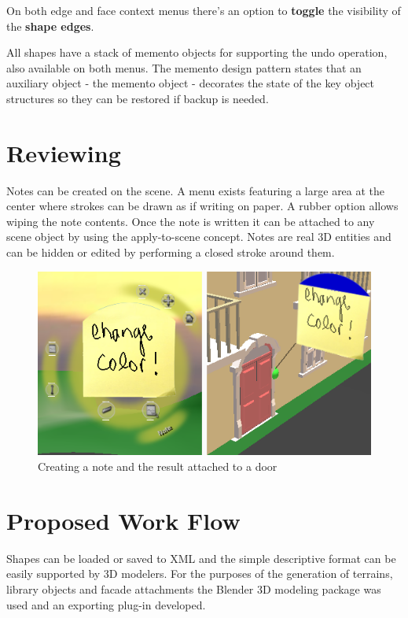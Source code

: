 On both edge and face context menus there's an option to \textbf{toggle} the visibility of the \textbf{shape edges}.

All shapes have a stack of memento objects for supporting the undo operation, also available on both menus.
The memento design pattern states that an auxiliary object - the memento object - decorates the state of the key object structures so they
can be restored if backup is needed.


\section{Reviewing}

Notes can be created on the scene. A menu exists featuring a large area at the center where strokes can be drawn as if writing on paper.
A rubber option allows wiping the note contents. Once the note is written it can be attached to any scene object by using the
apply-to-scene concept. Notes are real 3D entities and can be hidden or edited by performing a closed stroke around them.

\begin{figure}[ht]
	\centering
		\includegraphics[scale=0.5]{gfx/note.png}
	\caption{Creating a note and the result attached to a door}
	\label{fig:note}
\end{figure}


\section{Proposed Work Flow}

Shapes can be loaded or saved to XML and the simple descriptive format can be easily supported by 3D modelers.
For the purposes of the generation of terrains, library objects and facade attachments the Blender 3D modeling package
was used and an exporting plug-in developed.

